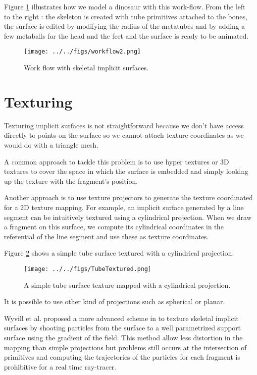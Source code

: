 \documentclass[annual]{acmsiggraph}
\begin{document}
Figure \ref{workflow2} illustrates how we model a dinosaur with this work-flow.
From the left to the right :  the skeleton is created with tube primitives attached to the bones, the surface is edited by modifying the radius of the metatubes and by adding a few metaballs for the head and the feet and the surface is ready to be animated.

\begin{figure}[ht]
  \centering
  \texttt{[image: ../../figs/workflow2.png]}
  \caption{Work flow with skeletal implicit surfaces.}
  \label{workflow2}
\end{figure}


\section{Texturing}


Texturing implicit surfaces is not straightforward because we don't have access directly to points on the surface so we cannot attach texture coordinates as we would do with a triangle mesh.

A common approach to tackle this problem is to use hyper textures or 3D textures to cover the space in which the surface is embedded and simply looking up the texture with the fragment's position.

Another approach is to use texture projectors to generate the texture coordinated for a 2D texture mapping.
For example, an implicit surface generated by a line segment can be intuitively textured using a cylindrical projection.
When we draw a fragment on this surface, we compute its cylindrical coordinates in the referential of the line segment and use these as texture coordinates.


Figure \ref{tubetex} shows a simple tube surface textured with a cylindrical projection. 
\begin{figure}[ht]
  \centering
  \texttt{[image: ../../figs/TubeTextured.png]}
  \caption{A simple tube surface texture mapped with a cylindrical projection.}
  \label{tubetex}
\end{figure}

It is possible to use other kind of projections such as spherical or planar.

Wyvill et al. proposed a more advanced scheme in \cite{Tigges98texturemapping}to texture skeletal implicit surfaces by shooting particles from the surface to a well parametrized support surface using the gradient of the field.
This method allow less distortion in the mapping than simple projections but problems still occurs at the intersection of primitives and computing the trajectories of the particles for each fragment is prohibitive for a real time ray-tracer.
\end{document}
